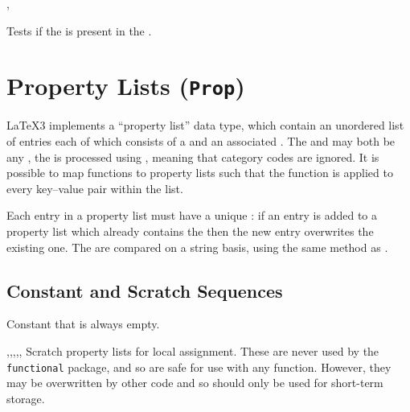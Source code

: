 \documentclass[oneside]{book}
\begin{document}
\begin{function}{\SeqVarIfIn,\SeqVarIfInTF}
\begin{syntax}
  
    
\end{syntax}
Tests if the  is present in the .
\begin{demohigh}
\SeqSetFromClist {}
\SeqVarIfInTF {} {} {}
\SeqVarIfInTF {} {} {}
\end{demohigh}
\end{function}

\chapter{Property Lists (\texttt{Prop})}

\LaTeX3 implements a \enquote{property list} data type, which contain
an unordered list of entries each of which consists of a  and
an associated . The  and  may both
be any , the  is processed using
, meaning that category codes are ignored. It is possible to
map functions to property lists such that the function is applied to every
key--value pair within the list.

Each entry in a property list must have a unique : if an entry is
added to a property list which already contains the  then the new
entry overwrites the existing one. The  are compared on a
string basis, using the same method as .


\section{Constant and Scratch Sequences}

\begin{variable}{\cEmptyProp}
Constant that is always empty.
\end{variable}

\begin{variable}{\lTmpaProp,\lTmpbProp,\lTmpcProp,\lTmpiProp,\lTmpjProp,\lTmpkProp}
Scratch property lists for local assignment. These are never used by
the \verb!functional! package, and so are safe for use with any
function. However, they may be overwritten by other
code and so should only be used for short-term storage.
\end{variable}
\end{document}
